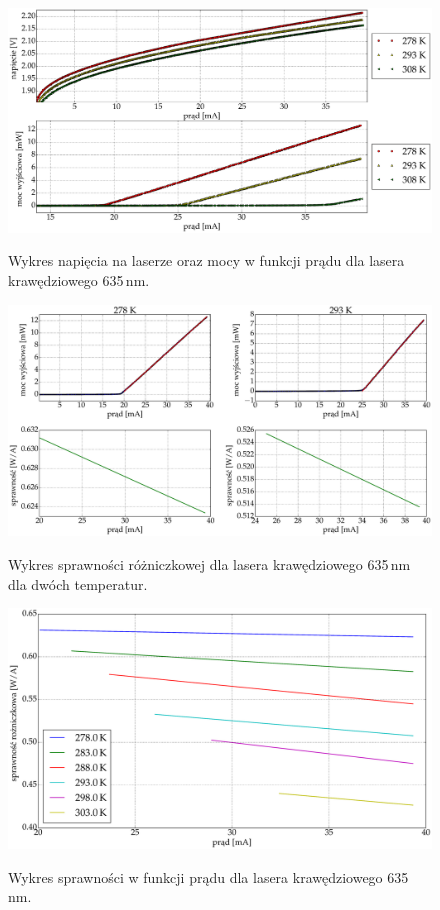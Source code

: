 \begin{figure}
\center
  \includegraphics[scale=0.30]{plot635/plot_voltage_power.eps}
  \label{rys3}
  \caption{Wykres napięcia na laserze oraz mocy w funkcji prądu dla lasera krawędziowego 635\,nm.}
\end{figure}
\begin{figure}
\center
  \includegraphics[scale=0.30]{plot635/plot_eff_via_current4.eps}
  \label{rys3}
  \caption{Wykres sprawności różniczkowej dla lasera krawędziowego 635\,nm dla dwóch temperatur.}
\end{figure}
\begin{figure}
\center
  \includegraphics[scale=0.30]{plot635/plot_eff_via_current_all.eps}
  \label{rys3}
  \caption{Wykres sprawności w funkcji prądu dla lasera krawędziowego 635\,nm.}
\end{figure}